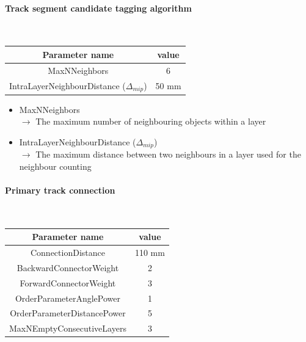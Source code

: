 \documentclass[cits]{JINST}
\begin{document}
\paragraph{Track segment candidate tagging algorithm} ~

\begin{table}[!h]
  \begin{center}
    \begin{tabu} to \linewidth { c | c } 
          Parameter name & value \\
          \hline
          MaxNNeighbors & 6 \\
          IntraLayerNeighbourDistance ($\Delta_{mip}$) & 50 mm
    \end{tabu} 
  \end{center}
\end{table}

\begin{itemize}
  \item MaxNNeighbors \\
  $\rightarrow$ The maximum number of neighbouring objects within a layer
  \item IntraLayerNeighbourDistance ($\Delta_{mip}$) \\
  $\rightarrow$ The maximum distance between two neighbours in a layer used for the neighbour counting
\end{itemize}

\newpage
\paragraph{Primary track connection} ~

\begin{table}[!ht]
  \begin{center}
    \begin{tabu} to \linewidth { c | c } 
          Parameter name & value \\
          \hline
          ConnectionDistance & 110 mm \\ 
          BackwardConnectorWeight & 2 \\ 
          ForwardConnectorWeight & 3 \\ 
          OrderParameterAnglePower & 1 \\ 
          OrderParameterDistancePower & 5 \\
          MaxNEmptyConsecutiveLayers & 3 
    \end{tabu} 
  \end{center}
\end{table}
\end{document}
